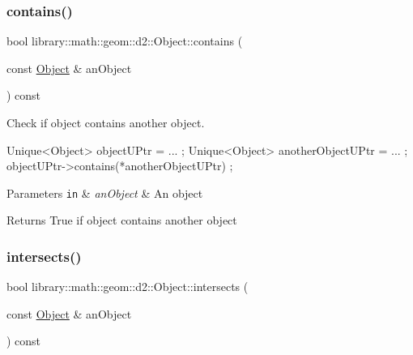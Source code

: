 \mbox{\label{classlibrary_1_1math_1_1geom_1_1d2_1_1_object_a7bc14e621db51aec72eff0fa5da295ac}} 
\subsubsection{\texorpdfstring{contains()}{contains()}}
{\footnotesize\ttfamily bool library\+::math\+::geom\+::d2\+::\+Object\+::contains (\begin{DoxyParamCaption}\item[{const \hyperlink{classlibrary_1_1math_1_1geom_1_1d2_1_1_object}{Object} \&}]{an\+Object }\end{DoxyParamCaption}) const\hspace{0.3cm}{\ttfamily [virtual]}}



Check if object contains another object. 


\begin{DoxyCode}
Unique<Object> objectUPtr = ... ;
Unique<Object> anotherObjectUPtr = ... ;
objectUPtr->contains(*anotherObjectUPtr) ;
\end{DoxyCode}



\begin{DoxyParams}[1]{Parameters}
\mbox{\tt in}  & {\em an\+Object} & An object \\
\hline
\end{DoxyParams}
\begin{DoxyReturn}{Returns}
True if object contains another object 
\end{DoxyReturn}
\mbox{\label{classlibrary_1_1math_1_1geom_1_1d2_1_1_object_a22819b510e52283c19c4ed947e0cba97}} 
\subsubsection{\texorpdfstring{intersects()}{intersects()}}
{\footnotesize\ttfamily bool library\+::math\+::geom\+::d2\+::\+Object\+::intersects (\begin{DoxyParamCaption}\item[{const \hyperlink{classlibrary_1_1math_1_1geom_1_1d2_1_1_object}{Object} \&}]{an\+Object }\end{DoxyParamCaption}) const\hspace{0.3cm}{\ttfamily [virtual]}}



